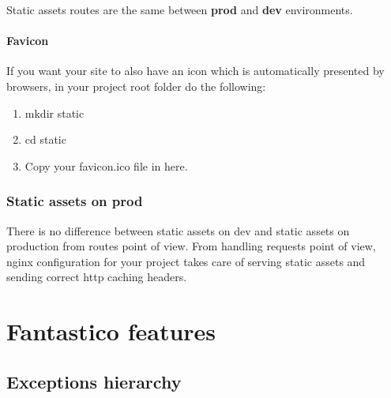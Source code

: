 \documentclass[letterpaper,10pt,english]{sphinxmanual}
\begin{document}
Static assets routes are the same between \textbf{prod} and \textbf{dev} environments.


\subsubsection{Favicon}
\label{how_to/static_assets:favicon}
If you want your site to also have an icon which is automatically presented by browsers, in your project root folder
do the following:
\begin{enumerate}
\item {} 
mkdir static

\item {} 
cd static

\item {} 
Copy your favicon.ico file in here.

\end{enumerate}


\subsection{Static assets on prod}
\label{how_to/static_assets:static-assets-on-prod}
There is no difference between static assets on dev and static assets on production from routes point of view.
From handling requests point of view, nginx configuration for your project takes care of serving static assets
and sending correct http caching headers.


\chapter{Fantastico features}
\label{features/features::doc}\label{features/features:fantastico-features}

\section{Exceptions hierarchy}
\label{features/exceptions:exceptions-hierarchy}\label{features/exceptions::doc}
\end{document}
